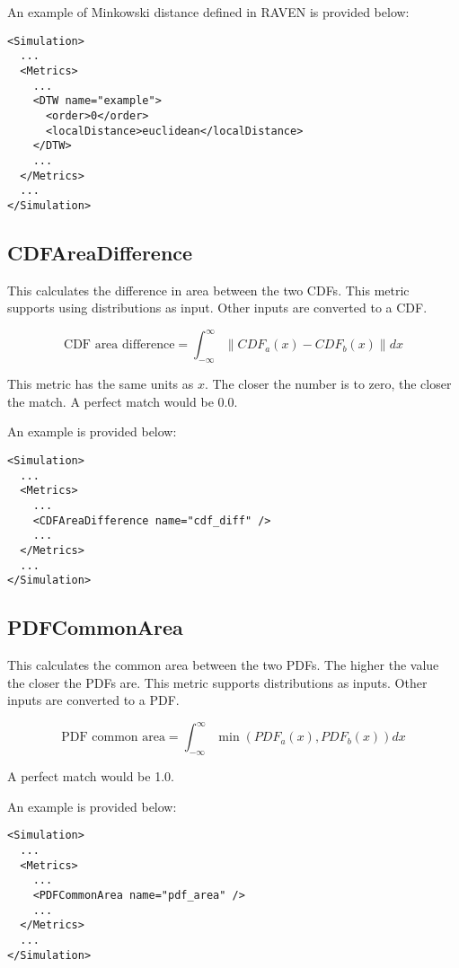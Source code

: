 An example of Minkowski distance defined in RAVEN is provided below:
\begin{lstlisting}[style=XML]
<Simulation>
  ...
  <Metrics>
    ...
    <DTW name="example">
      <order>0</order>
      <localDistance>euclidean</localDistance>
    </DTW>
    ...
  </Metrics>
  ...
</Simulation>
\end{lstlisting}

\subsection{CDFAreaDifference}
\label{subsubsec:metric_CDFAreaDifference}
This calculates the difference in area between the two CDFs.  This
metric supports using distributions as input.  Other inputs are
converted to a CDF.

\begin{equation}
  \text{CDF area difference} = \int_{-\infty}^{\infty}{\|CDF_a(x)-CDF_b(x)\|dx}
\end{equation}

This metric has the same units as $x$.  The closer the number is
to zero, the closer the match.  A perfect match would be 0.0.

An example is provided below:
\begin{lstlisting}[style=XML]
<Simulation>
  ...
  <Metrics>
    ...
    <CDFAreaDifference name="cdf_diff" />
    ...
  </Metrics>
  ...
</Simulation>
\end{lstlisting}

\subsection{PDFCommonArea}
\label{subsubsec:metric_PDFCommonArea}
This calculates the common area between the two PDFs.  The higher the
value the closer the PDFs are.  This metric supports distributions as
inputs.  Other inputs are converted to a PDF.

\begin{equation}
  \text{PDF common area} = \int_{-\infty}^{\infty}{\min(PDF_a(x),PDF_b(x))}dx
\end{equation}

A perfect match would be 1.0.


An example is provided below:
\begin{lstlisting}[style=XML]
<Simulation>
  ...
  <Metrics>
    ...
    <PDFCommonArea name="pdf_area" />
    ...
  </Metrics>
  ...
</Simulation>
\end{lstlisting}

